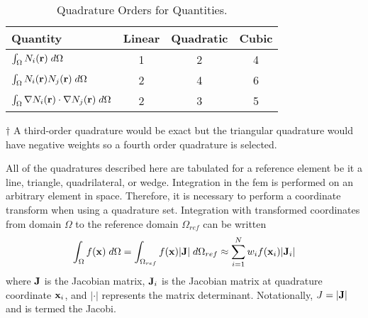     \begin{table}
      \begin{center}
        \caption{Quadrature Orders for  Quantities.}
        \label{tab:quadrature_orders}
        \begin{threeparttable}
          \begin{tabular*}{0.8\textwidth}{@{\extracolsep{\fill}}lccc}
            \toprule
            Quantity & Linear & Quadratic & Cubic \\
            \midrule
            $\int_{\Omega} N_i(\mathbf{r}) \;d\Omega$ & 1 & 2 & 4
              \tnote{$\dagger$} \\
            $\int_{\Omega} N_i(\mathbf{r}) N_j(\mathbf{r}) \;d\Omega$ &
              2 & 4 & 6 \\
            $\int_{\Omega} \mathbf{\nabla} N_i(\mathbf{r}) \cdot \mathbf{\nabla} N_j(\mathbf{r}) 
              \;d\Omega$ & 2 & 3 & 5 \\
            \bottomrule
          \end{tabular*}
          \begin{tablenotes}
            \item[$\dagger$] A third-order quadrature would be exact but the 
              triangular quadrature would have negative weights so a fourth 
              order quadrature is selected.
          \end{tablenotes}
        \end{threeparttable}
      \end{center}
    \end{table}
    
    All of the quadratures described here are tabulated for a reference element
    be it a line, triangle, quadrilateral, or wedge. Integration in the 
    \gls{fem} is performed on an arbitrary element in space. Therefore, it is 
    necessary to perform a coordinate transform when using a quadrature set.
    Integration with transformed coordinates from domain $\Omega$ to the
    reference domain $\Omega_{ref}$ can be written
    \begin{equation}
      \int_{\Omega} f(\mathbf{x}) \;d\Omega = 
        \int_{\Omega_{ref}} f(\mathbf{x}) \lvert \mathbf{J} \rvert \;d\Omega_{ref} \approx
        \sum_{i=1}^{N} w_i f(\mathbf{x}_i) \lvert \mathbf{J}_i \rvert
    \end{equation}
    where $\mathbf{J}$ is the Jacobian matrix, $\mathbf{J}_i$ is the Jacobian matrix at 
    quadrature coordinate $\mathbf{x}_i$, and $\lvert \cdot \rvert$ represents
    the matrix determinant. Notationally, $J=\lvert \mathbf{J} \rvert$ and is termed
    the Jacobi.


